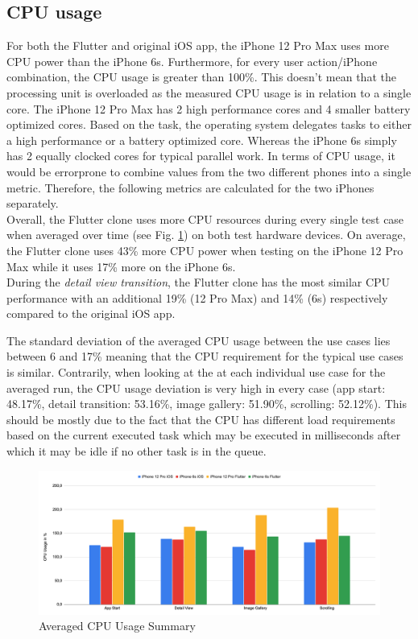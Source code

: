 \subsection{CPU usage} \label{section::cpu_usage}
For both the Flutter and original iOS app, the iPhone 12 Pro Max uses more CPU power than the iPhone 6s. Furthermore, for every user action/iPhone combination, the 
CPU usage is greater than 100\%. This doesn't mean that the processing unit is overloaded as the measured CPU usage is in relation to a single core.
The iPhone 12 Pro Max has 2 high performance cores and 4 smaller battery optimized cores. Based on the task, the operating system delegates tasks to either a high performance or a 
battery optimized core.
Whereas the iPhone 6s simply has 2 equally clocked cores for typical parallel work.
In terms of CPU usage, it would be errorprone to combine values from the two different phones into a single metric. Therefore, the following metrics are calculated for the two iPhones separately.\\
Overall, the Flutter clone uses more CPU resources during every single test case when averaged over time (see Fig. \ref{fig:avg_cpu_usage_summary}) on both test hardware devices.
On average, the Flutter clone uses 43\% more CPU power when testing on the iPhone 12 Pro Max while it uses 17\% more on the iPhone 6s.\\
During the \textit{detail view transition}, the Flutter clone has the most similar CPU performance with an additional 19\% (12 Pro Max) and 14\% (6s) respectively compared to the original iOS app.

The standard deviation of the averaged CPU usage between the use cases lies between 6 and 17\% meaning that the CPU requirement for the typical use cases is similar.
Contrarily, when looking at the at each individual use case for the averaged run, the CPU usage deviation is very high in every case (app start: 48.17\%, detail transition: 53.16\%, image gallery: 51.90\%, scrolling: 52.12\%).
This should be mostly due to the fact that the CPU has different load requirements based on the current executed task which may be executed in milliseconds after which it may be idle if no other task is in the queue.

\begin{figure}[!h]
    \centering
    \includegraphics[width=\linewidth]{images/performance_results/summary_charts/avg_cpu_usage_summary.png}
    \caption{Averaged CPU Usage Summary}
    \label{fig:avg_cpu_usage_summary}
\end{figure}

